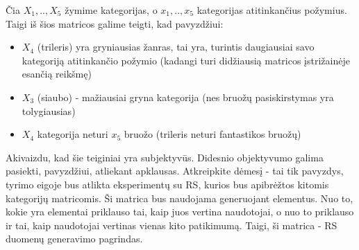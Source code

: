 \documentclass{VUMIFInfMagistrinis}
\begin{document}
Čia $X_1, .., X_5$ žymime kategorijas, o $x_1, .., x_5$ kategorijas atitinkančius požymius. Taigi iš šios matricos galime teigti, kad pavyzdžiui:
\begin{itemize}
	\item $X_4$ (trileris) yra gryniausias žanras, tai yra, turintis daugiausiai savo kategoriją atitinkančio požymio (kadangi turi didžiausią matricos įstrižainėje esančią reikšmę)
	\item $X_3$ (siaubo) - mažiausiai gryna kategorija (nes bruožų pasiskirstymas yra tolygiausias)
	\item $X_4$ kategorija neturi $x_5$ bruožo (trileris neturi fantastikos bruožų)
\end{itemize} 
Akivaizdu, kad šie teiginiai yra subjektyvūs. Didesnio objektyvumo galima pasiekti, pavyzdžiui, atliekant apklausas.
\newline
\indent
Atkreipkite dėmesį - tai tik pavyzdys, tyrimo eigoje bus atlikta eksperimentų su RS, kurios bus apibrėžtos kitomis kategorijų matricomis. 
\newline
\indent
Ši matrica bus naudojama generuojant elementus. Nuo to, kokie yra elementai priklauso tai, kaip juos vertina naudotojai, o nuo to priklauso ir tai, kaip naudotojai vertinas vienas kito patikimumą. Taigi, ši matrica - RS duomenų generavimo pagrindas.
\end{document}
